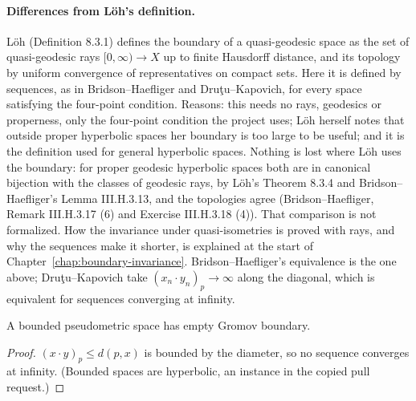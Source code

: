 \paragraph{Differences from L\"oh's definition.} L\"oh (Definition 8.3.1) defines the boundary of a
quasi-geodesic space as the set of quasi-geodesic rays $[0, \infty) \to X$ up to finite Hausdorff
distance, and its topology by uniform convergence of representatives on compact sets. Here it is
defined by sequences, as in Bridson--Haefliger and Dru\c{t}u--Kapovich, for every space satisfying
the four-point condition. Reasons: this needs no rays, geodesics or properness, only the four-point
condition the project uses; L\"oh herself notes that outside proper hyperbolic spaces her boundary
is too large to be useful; and it is the definition used for general hyperbolic spaces. Nothing is
lost where L\"oh uses the boundary: for proper geodesic hyperbolic spaces both are in canonical
bijection with the classes of geodesic rays, by L\"oh's Theorem 8.3.4 and Bridson--Haefliger's
Lemma III.H.3.13, and the topologies agree (Bridson--Haefliger, Remark III.H.3.17 (6) and
Exercise III.H.3.18 (4)). That comparison is not formalized. How the invariance under
quasi-isometries is proved with rays, and why the sequences make it shorter, is explained at the
start of Chapter~\ref{chap:boundary-invariance}. Bridson--Haefliger's equivalence is the
one above; Dru\c{t}u--Kapovich take $(x_n \cdot y_n)_p \to \infty$ along the diagonal, which is
equivalent for sequences converging at infinity.

\begin{lemma}
  \label{Metric.GromovBoundary.isEmpty_of_boundedSpace}
  A bounded pseudometric space has empty Gromov boundary.
\end{lemma}
\begin{proof}
  $(x \cdot y)_p \le d(p, x)$ is bounded by the diameter, so no sequence converges at infinity.
  (Bounded spaces are hyperbolic, an instance in the copied pull request.)
\end{proof}

